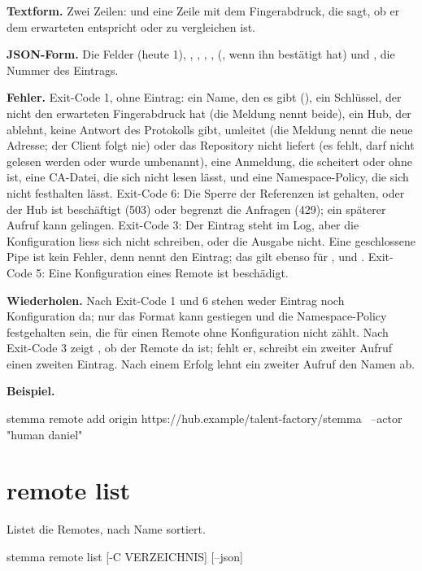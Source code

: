 {\bf Textform.} Zwei Zeilen:  und eine Zeile mit dem
Fingerabdruck, die sagt, ob er dem erwarteten entspricht oder zu vergleichen ist.

{\bf JSON-Form.} Die Felder  (heute 1), , ,
, ,  (, wenn 
ihn bestätigt hat) und , die Nummer des Eintrags.

{\bf Fehler.} Exit-Code 1, ohne Eintrag: ein Name, den es gibt (), ein
Schlüssel, der nicht den erwarteten Fingerabdruck hat (die Meldung nennt beide), ein Hub, der
ablehnt, keine Antwort des Protokolls gibt, umleitet (die Meldung nennt die neue Adresse; der
Client folgt nie) oder das Repository nicht liefert (es fehlt, darf nicht gelesen werden oder
wurde umbenannt), eine Anmeldung, die scheitert oder ohne  ist, eine CA-Datei, die
sich nicht lesen lässt, und eine Namespace-Policy, die sich nicht festhalten lässt.
Exit-Code 6: Die Sperre der Referenzen ist gehalten, oder der Hub ist beschäftigt (503) oder
begrenzt die Anfragen (429); ein späterer Aufruf kann gelingen.
Exit-Code 3: Der Eintrag steht im Log, aber die Konfiguration liess sich nicht schreiben, oder
die Ausgabe nicht. Eine geschlossene Pipe ist kein Fehler, denn  nennt den Eintrag;
das gilt ebenso für ,  und .
Exit-Code 5: Eine Konfiguration eines Remote ist beschädigt.

{\bf Wiederholen.} Nach Exit-Code 1 und 6 stehen weder Eintrag noch Konfiguration da; nur das
Format kann gestiegen und die Namespace-Policy festgehalten sein, die für einen Remote ohne
Konfiguration nicht zählt. Nach Exit-Code 3 zeigt
, ob der Remote da ist; fehlt er, schreibt ein zweiter Aufruf einen zweiten
Eintrag. Nach einem Erfolg lehnt ein zweiter Aufruf den Namen ab.

{\bf Beispiel.}

\starttyping
stemma remote add origin https://hub.example/talent-factory/stemma \
    --actor "human daniel"
\stoptyping

\section{remote list}

Listet die Remotes, nach Name sortiert.

\starttyping
stemma remote list [-C VERZEICHNIS] [--json]
\stoptyping

